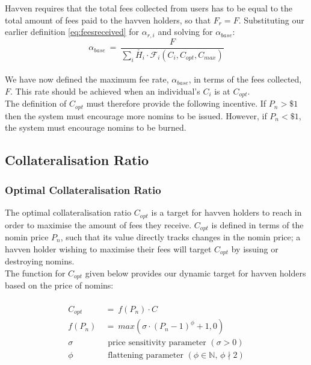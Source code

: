 \noindent Havven requires that the total fees collected from users has to be equal to the total amount of
fees paid to the havven holders, so that $F_{r} = F$. Substituting our earlier definition \eqref{eq:feesreceived} for $\alpha_{r,i}$ and solving for $\alpha_{base} $: \\

\begin{equation}
\alpha_{base} \ = \ \frac{F}{\sum_{i} \check{H_{i}} \cdot \mathcal{F}_{i}(C_{i}, C_{opt}, C_{max})} \label{eq:10}
\end{equation} \\

\noindent We have now defined the maximum fee rate, $\alpha_{base}$, in terms of the fees collected, $F$. This rate should be achieved when an individual's $C_i$ is at $C_{opt}$. \\

\noindent The definition of $C_{opt}$ must therefore provide the following incentive. If $P_n > \$1$ then the system must encourage more nomins to be issued. However, if $P_n < \$1$, the system must encourage nomins to be burned.

\newpage

\subsection{Collateralisation Ratio}
\subsubsection{Optimal Collateralisation Ratio}

\noindent The optimal collateralisation ratio $C_{opt}$ is a target for havven
holders to reach in order to maximise the amount of fees they receive.
$C_{opt}$ is defined in terms of the nomin price $P_n$, such that its value directly tracks changes in the nomin price; a havven
holder wishing to maximise their fees will target $C_{opt}$ by issuing or destroying nomins. \\

\noindent The function for $C_{opt}$ given below provides our dynamic target
for havven holders based on the price of nomins:

\begin{gather} \label{eq:optcollateralisation}
\begin{align}
\begin{split}
C_{opt} \ &= \ f(P_{n}) \cdot C  \\ 
f(P_n) \ &= \ max(\sigma \cdot (P_n - 1)^{\phi} + 1, 0) \\
\sigma \ & \text{ \ price sensitivity parameter } (\sigma > 0)\\
\phi   \ & \text{ \ flattening parameter } (\phi \in \mathbb{N} \text{, } \phi \nmid 2) \\
\end{split}
\end{align}
\end{gather}



